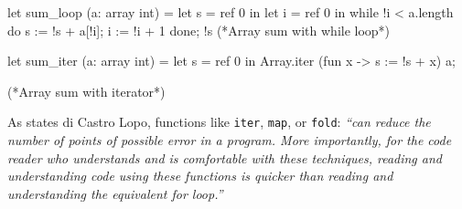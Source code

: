 \documentclass[a4paper,11pt,oneside]{article}
\theoremstyle{plain}
\begin{document}
\begin{small}
	\begin{minipage}[t]{0.4\linewidth}
		\begin{whycode}  
 let sum_loop (a: array int) =		
  let s = ref 0 in
  let i = ref 0 in
  while !i < a.length do
    s := !s + a[!i];
    i := !i + 1
  done; !s 
 (*Array sum with while loop*)
		\end{whycode}
	\end{minipage}\hfill 
	\begin{minipage}[t]{0.51\linewidth}
		\begin{whycode} 
  let sum_iter (a: array int) =		 
    let s = ref 0 in
    Array.iter (fun x -> s := !s + x) a;



 
    (*Array sum with iterator*)
		\end{whycode}	
	\end{minipage}
\end{small}

	As states di Castro Lopo, functions like \texttt{iter}, \texttt{map}, or \texttt{fold}: \textit{``can reduce the number of points of possible error in a program. 
	More importantly, for the code reader who understands and is comfortable with these techniques, reading and understanding code using these functions is quicker than reading and understanding the equivalent for loop.''}
			
\end{document}
